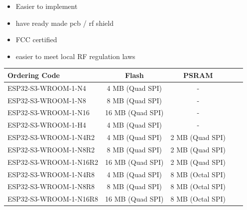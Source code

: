 \documentclass[conference]{IEEEtran}
\begin{document}
\begin{itemize}
\begin{enumerate}[label=\arabic*.]
\begin{itemize}
\item Easier to implement\\
\item have ready made pcb / rf shield\\
\item FCC certified\\
\item easier to meet local RF regulation laws\\
\end{itemize}
\end{enumerate}

\begin{table}[H]
\centering
\begin{tabular}{lcccr}
\toprule
Ordering Code          & Flash            & PSRAM          \\
\midrule
ESP32-S3-WROOM-1-N4    & 4 MB (Quad SPI)  & -              \\
ESP32-S3-WROOM-1-N8    & 8 MB (Quad SPI)  & -              \\
ESP32-S3-WROOM-1-N16   & 16 MB (Quad SPI) & -              \\
ESP32-S3-WROOM-1-H4    & 4 MB (Quad SPI)  & -              \\
ESP32-S3-WROOM-1-N4R2  & 4 MB (Quad SPI)  & 2 MB (Quad SPI)\\
ESP32-S3-WROOM-1-N8R2  & 8 MB (Quad SPI)  & 2 MB (Quad SPI)\\
ESP32-S3-WROOM-1-N16R2 & 16 MB (Quad SPI) & 2 MB (Quad SPI)\\
ESP32-S3-WROOM-1-N4R8  & 4 MB (Quad SPI)  & 8 MB (Octal SPI)\\
ESP32-S3-WROOM-1-N8R8  & 8 MB (Quad SPI)  & 8 MB (Octal SPI)\\
ESP32-S3-WROOM-1-N16R8 & 16 MB (Quad SPI) & 8 MB (Octal SPI)\\
\bottomrule
\end{tabular}
\end{table}

\end{itemize}
\end{document}
